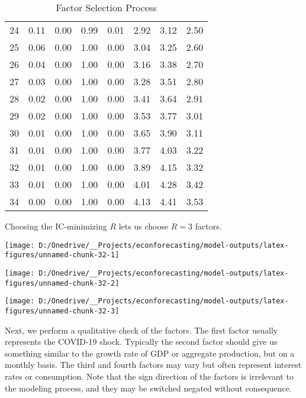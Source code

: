 \documentclass[11pt, letterpaper]{article}\usepackage[]{graphicx}\usepackage[]{color}
\begin{document}
\begin{table}[H]
\begin{tabular}{cccccccc}
   24 & 0.11 & 0.00 & 0.99 & 0.01 & 2.92 & 3.12 & 2.50 \\ 
   25 & 0.06 & 0.00 & 1.00 & 0.00 & 3.04 & 3.25 & 2.60 \\ 
   26 & 0.04 & 0.00 & 1.00 & 0.00 & 3.16 & 3.38 & 2.70 \\ 
   27 & 0.03 & 0.00 & 1.00 & 0.00 & 3.28 & 3.51 & 2.80 \\ 
   28 & 0.02 & 0.00 & 1.00 & 0.00 & 3.41 & 3.64 & 2.91 \\ 
   29 & 0.02 & 0.00 & 1.00 & 0.00 & 3.53 & 3.77 & 3.01 \\ 
   30 & 0.01 & 0.00 & 1.00 & 0.00 & 3.65 & 3.90 & 3.11 \\ 
   31 & 0.01 & 0.00 & 1.00 & 0.00 & 3.77 & 4.03 & 3.22 \\ 
   32 & 0.01 & 0.00 & 1.00 & 0.00 & 3.89 & 4.15 & 3.32 \\ 
   33 & 0.01 & 0.00 & 1.00 & 0.00 & 4.01 & 4.28 & 3.42 \\ 
   34 & 0.00 & 0.00 & 1.00 & 0.00 & 4.13 & 4.41 & 3.53 \\ 
   \hline
\end{tabular}
\endgroup
\caption{Factor Selection Process} 
\end{table}


Choosing the IC-minimizing $R$ lets us choose $R = 3$ factors.



{\centering \texttt{[image: D:/Onedrive/\_\_Projects/econforecasting/model-outputs/latex-figures/unnamed-chunk-32-1]} 

}




{\centering \texttt{[image: D:/Onedrive/\_\_Projects/econforecasting/model-outputs/latex-figures/unnamed-chunk-32-2]} 

}




{\centering \texttt{[image: D:/Onedrive/\_\_Projects/econforecasting/model-outputs/latex-figures/unnamed-chunk-32-3]} 

}




Next, we perform a qualitative check of the factors. The first factor usually represents the COVID-19 shock. Typically the second factor should give us something similar to the growth rate of GDP or aggregate production, but on a monthly basis. The third and fourth factors may vary but often represent interest rates or consumption. Note that the sign direction of the factors is irrelevant to the modeling process, and they may be switched negated without consequence. 
\end{document}
